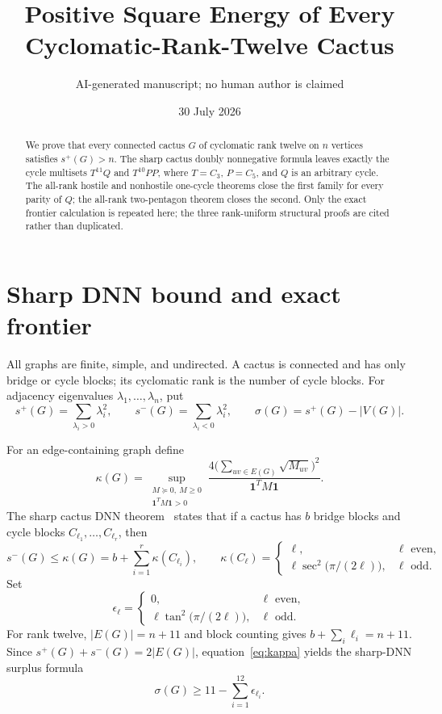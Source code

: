 \documentclass[11pt]{article}
\title{Positive Square Energy of Every Cyclomatic-Rank-Twelve Cactus}
\author{AI-generated manuscript; no human author is claimed}
\date{30 July 2026}
\newcommand{\splus}{s^+}
\newcommand{\sminus}{s^-}
\newcommand{\sig}{\sigma}
\newcommand{\one}{\mathbf 1}
\begin{document}
\maketitle

\begin{abstract}
We prove that every connected cactus $G$ of cyclomatic rank twelve on $n$
vertices satisfies $s^+(G)>n$.  The sharp cactus doubly nonnegative formula
leaves exactly the cycle multisets $T^{11}Q$ and $T^{10}PP$, where
$T=C_3$, $P=C_5$, and $Q$ is an arbitrary cycle.  The all-rank hostile and
nonhostile one-cycle theorems close the first family for every parity of $Q$;
the all-rank two-pentagon theorem closes the second.  Only the exact frontier
calculation is repeated here; the three rank-uniform structural proofs are
cited rather than duplicated.
\end{abstract}

\section{Sharp DNN bound and exact frontier}

All graphs are finite, simple, and undirected.  A cactus is connected and has
only bridge or cycle blocks; its cyclomatic rank is the number of cycle blocks.
For adjacency eigenvalues $\lambda_1,\ldots,\lambda_n$, put
\[
 \splus(G)=\sum_{\lambda_i>0}\lambda_i^2,
 \qquad
 \sminus(G)=\sum_{\lambda_i<0}\lambda_i^2,
 \qquad
 \sig(G)=\splus(G)-|V(G)|.
\]

For an edge-containing graph define
\[
 \kappa(G)=\sup_{\substack{M\succeq0,\ M\geq0\\\one^TM\one>0}}
 \frac{4\bigl(\sum_{uv\in E(G)}\sqrt{M_{uv}}\bigr)^2}
      {\one^TM\one}.
\]
The sharp cactus DNN theorem~\cite{DNN,LTZ} states that if a cactus has $b$
bridge blocks and cycle blocks $C_{\ell_1},\ldots,C_{\ell_r}$, then
\begin{equation}\label{eq:kappa}
 \sminus(G)\leq\kappa(G)
 =b+\sum_{i=1}^r\kappa(C_{\ell_i}),
 \qquad
 \kappa(C_\ell)=
 \begin{cases}
  \ell,&\ell\text{ even},\\
  \ell\sec^2\!\bigl(\pi/(2\ell)\bigr),&\ell\text{ odd}.
 \end{cases}
\end{equation}
Set
\[
 \epsilon_\ell=
 \begin{cases}
  0,&\ell\text{ even},\\
  \ell\tan^2\!\bigl(\pi/(2\ell)\bigr),&\ell\text{ odd}.
 \end{cases}
\]
For rank twelve, $|E(G)|=n+11$ and block counting gives
$b+\sum_i\ell_i=n+11$.  Since
$\splus(G)+\sminus(G)=2|E(G)|$, equation~\eqref{eq:kappa} yields the sharp-DNN
surplus formula
\begin{equation}\label{eq:surplus}
 \boxed{\sig(G)\geq11-\sum_{i=1}^{12}\epsilon_{\ell_i}.}
\end{equation}
\end{document}
